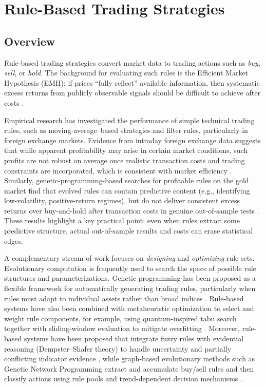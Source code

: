 
\section{Rule-Based Trading Strategies}

\subsection{Overview}

Rule-based trading strategies convert market data to trading actions such as \emph{buy}, \emph{sell}, or \emph{hold}. The background for evaluating such rules is the Efficient Market Hypothesis (EMH): if prices ``fully reflect'' available information, then systematic excess returns from publicly observable signals should be difficult to achieve after costs \citep{fama1970efficient}. 

Empirical research has investigated the performance of simple technical trading rules, such as moving-average–based strategies and filter rules, particularly in foreign exchange markets. Evidence from intraday foreign exchange data suggests that while apparent profitability may arise in certain market conditions, such profits are not robust on average once realistic transaction costs and trading constraints are incorporated, which is consistent with market efficiency \citep{curcio1997technical}. Similarly, genetic-programming-based searches for profitable rules on the gold market find that evolved rules can contain predictive content (e.g., identifying low-volatility, positive-return regimes), but do not deliver consistent excess returns over buy-and-hold after transaction costs in genuine out-of-sample tests \citep{allen1999using}. These results highlight a key practical point: even when rules extract some predictive structure, actual out-of-sample results and costs can erase statistical edges.

A complementary stream of work focuses on \emph{designing} and \emph{optimizing} rule sets. Evolutionary computation is frequently used to search the space of possible rule structures and parameterizations. Genetic programming has been proposed as a flexible framework for automatically generating trading rules, particularly when rules must adapt to individual assets rather than broad indices \citep{potvin2004generating}. Rule-based systems have also been combined with metaheuristic optimization to select and weight rule components, for example, using quantum-inspired tabu search together with sliding-window evaluation to mitigate overfitting \citep{chou2014rule}. Moreover, rule-based systems have been proposed that integrate fuzzy rules with evidential reasoning (Dempster--Shafer theory) to handle uncertainty and partially conflicting indicator evidence \citep{dymova2016forex}, while graph-based evolutionary methods such as Genetic Network Programming extract and accumulate buy/sell rules and then classify actions using rule pools and trend-dependent decision mechanisms \citep{mabu2013enhanced}.

